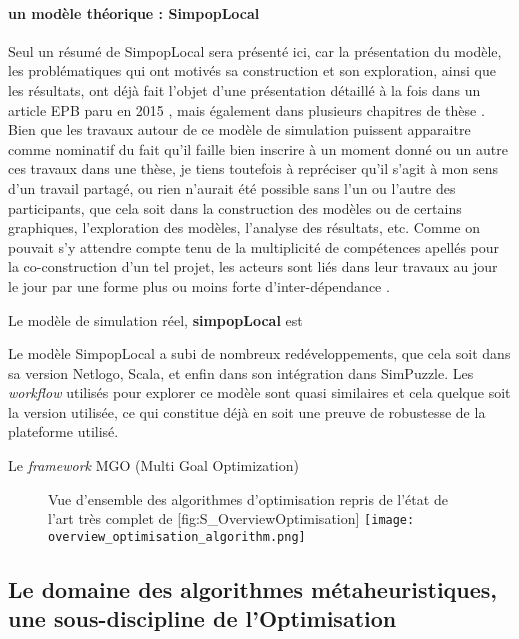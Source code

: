 \paragraph{un modèle théorique : SimpopLocal}

Seul un résumé de SimpopLocal sera présenté ici, car la présentation du modèle, les problématiques qui ont motivés sa construction et son exploration, ainsi que les résultats, ont déjà fait l'objet d'une présentation détaillé à la fois dans un article EPB paru en 2015 \autocite{Schmitt2015}, mais également dans plusieurs chapitres de thèse \autocite{Schmitt2014}. Bien que les travaux autour de ce modèle de simulation puissent apparaitre comme nominatif du fait qu'il faille bien inscrire à un moment donné ou un autre ces travaux dans une thèse, je tiens toutefois à repréciser qu'il s'agit à mon sens d'un travail partagé, ou rien n'aurait été possible sans l'un ou l'autre des participants, que cela soit dans la construction des modèles ou de certains graphiques, l'exploration des modèles, l'analyse des résultats, etc. Comme on pouvait s'y attendre compte tenu de la multiplicité de compétences apellés pour la co-construction d'un tel projet, les acteurs sont liés dans leur travaux au jour le jour par une forme plus ou moins forte d'inter-dépendance \autocite{Chapron2014}.

Le modèle de simulation réel, \textbf{simpopLocal} est 

Le modèle SimpopLocal a subi de nombreux redéveloppements, que cela soit dans sa version Netlogo, Scala, et enfin dans son intégration dans SimPuzzle. Les \textit{workflow} utilisés pour explorer ce modèle sont quasi similaires et cela quelque soit la version utilisée, ce qui constitue déjà en soit  une preuve de robustesse de la plateforme utilisé.

Le \textit{framework} MGO (Multi Goal Optimization)

\begin{figure}[h]
\begin{sidecaption}[fortoc]{ Vue d'ensemble des algorithmes d'optimisation repris de l'état de l'art très complet de \textcite[32]{Weise2011}}[fig:S_OverviewOptimisation]
  \centering
 \texttt{[image: overview\_optimisation\_algorithm.png]}
  \end{sidecaption}
\end{figure}

\subsection{Le domaine des algorithmes métaheuristiques, une sous-discipline de l'Optimisation}


